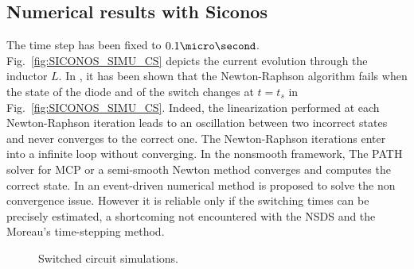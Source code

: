 \subsection{Numerical results with {\sc Siconos}}
\label{section32}

The time step has been fixed to $0.1 \micro \second$. Fig.~\ref{fig:SICONOS_SIMU_CS} depicts
the current evolution through the inductor $L$. In \cite{maffezzoni2006}, it has been shown that the
Newton-Raphson algorithm fails when the state of the diode and of the switch changes at $t=t_s$ in
Fig.~\ref{fig:SICONOS_SIMU_CS}. Indeed, the linearization performed at each Newton-Raphson
iteration leads to an oscillation between two incorrect states and never converges to the correct
one. The Newton-Raphson iterations enter into a infinite loop without converging. In the nonsmooth framework, The PATH solver\cite{Dirkse.Ferris1995} for MCP or a semi-smooth Newton method\cite{DeLuca.Facchinei.ea2000}  converges and computes the correct state. In \cite{maffezzoni2006} an event-driven numerical method is proposed to solve the non convergence issue. However it is reliable only if the switching times can be precisely estimated, a shortcoming not encountered  with the NSDS and the  Moreau's time-stepping method. 


\begin{figure*}[!ht]
  \hspace{-2mm}
 \caption{Switched circuit simulations.}
\label{figSimuCS}
\end{figure*}

